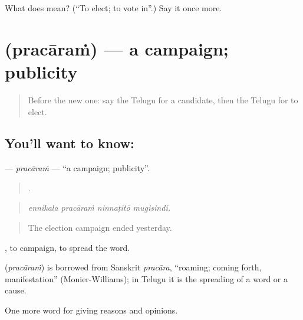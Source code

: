 \begin{tcolorbox}[breakable,colback=teal!4,colframe=teal!35!black,title={Before you move on}]
What does  mean? (\textquotedblleft{}To elect; to vote in\textquotedblright{}.) Say it once more.
\end{tcolorbox}
\section[\texorpdfstring{\te{ప్రచారం} (pracāraṁ)}{ప్రచారం (pracāraṁ)}]{ (pracāraṁ) — a campaign; publicity}

\label{lesson:TE-C400-pracaram}



\begin{quote}
Before the new one: say the Telugu for a candidate, then the Telugu for to elect.
\end{quote}

\subsection*{You'll want to know: }
\textbf{} — \emph{pracāraṁ} — \textquotedblleft{}a campaign; publicity\textquotedblright{}.

\begin{quote}
   .
\end{quote}

\begin{quote}
\emph{ennikala pracāraṁ ninnaṭitō mugisindi.}
\end{quote}

\begin{quote}
The election campaign ended yesterday.
\end{quote}

 , to campaign, to spread the word.

\begin{cousinweb}
\textbf{} (\emph{pracāraṁ}) is borrowed from Sanskrit \emph{pracāra}, \textquotedblleft{}roaming; coming forth, manifestation\textquotedblright{} (Monier-Williams); in Telugu it is the spreading of a word or a cause.
\end{cousinweb}

\begin{grammarlens}[title={What you've built}]
One more word for giving reasons and opinions.
\end{grammarlens}

